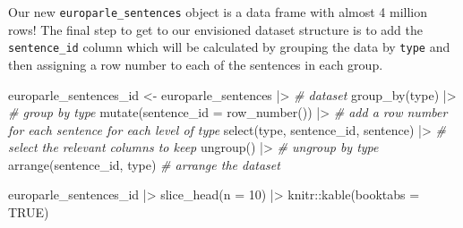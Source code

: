 \documentclass[
  letterpaper,
]{latex/krantz}
\newenvironment{Shaded}{\begin{snugshade}}{\end{snugshade}}
\newcommand{\AttributeTok}[1]{\textcolor[rgb]{0.00,0.00,0.00}{#1}}
\newcommand{\CommentTok}[1]{\textcolor[rgb]{0.00,0.00,0.00}{\textit{#1}}}
\newcommand{\ConstantTok}[1]{\textcolor[rgb]{0.00,0.00,0.00}{#1}}
\newcommand{\DecValTok}[1]{\textcolor[rgb]{0.00,0.00,0.00}{#1}}
\newcommand{\FunctionTok}[1]{\textcolor[rgb]{0.00,0.00,0.00}{#1}}
\newcommand{\NormalTok}[1]{\textcolor[rgb]{0.00,0.00,0.00}{#1}}
\newcommand{\OtherTok}[1]{\textcolor[rgb]{0.00,0.00,0.00}{#1}}
\newcommand{\SpecialCharTok}[1]{\textcolor[rgb]{0.00,0.00,0.00}{#1}}
\begin{document}
Our new \texttt{europarle\_sentences} object is a data frame with almost
4 million rows! The final step to get to our envisioned dataset
structure is to add the \texttt{sentence\_id} column which will be
calculated by grouping the data by \texttt{type} and then assigning a
row number to each of the sentences in each group.

\begin{Shaded}
\begin{Highlighting}[]
\NormalTok{europarle\_sentences\_id }\OtherTok{\textless{}{-}} 
\NormalTok{  europarle\_sentences }\SpecialCharTok{|\textgreater{}} \CommentTok{\# dataset}
  \FunctionTok{group\_by}\NormalTok{(type) }\SpecialCharTok{|\textgreater{}} \CommentTok{\# group by type}
  \FunctionTok{mutate}\NormalTok{(}\AttributeTok{sentence\_id =} \FunctionTok{row\_number}\NormalTok{()) }\SpecialCharTok{|\textgreater{}} \CommentTok{\# add a row number for each sentence for each level of type}
  \FunctionTok{select}\NormalTok{(type, sentence\_id, sentence) }\SpecialCharTok{|\textgreater{}} \CommentTok{\# select the relevant columns to keep}
  \FunctionTok{ungroup}\NormalTok{() }\SpecialCharTok{|\textgreater{}}  \CommentTok{\# ungroup by type}
  \FunctionTok{arrange}\NormalTok{(sentence\_id, type) }\CommentTok{\# arrange the dataset}

\NormalTok{europarle\_sentences\_id }\SpecialCharTok{|\textgreater{}} 
  \FunctionTok{slice\_head}\NormalTok{(}\AttributeTok{n =} \DecValTok{10}\NormalTok{) }\SpecialCharTok{|\textgreater{}} 
\NormalTok{  knitr}\SpecialCharTok{::}\FunctionTok{kable}\NormalTok{(}\AttributeTok{booktabs =} \ConstantTok{TRUE}\NormalTok{)}
\end{Highlighting}
\end{Shaded}
\end{document}
